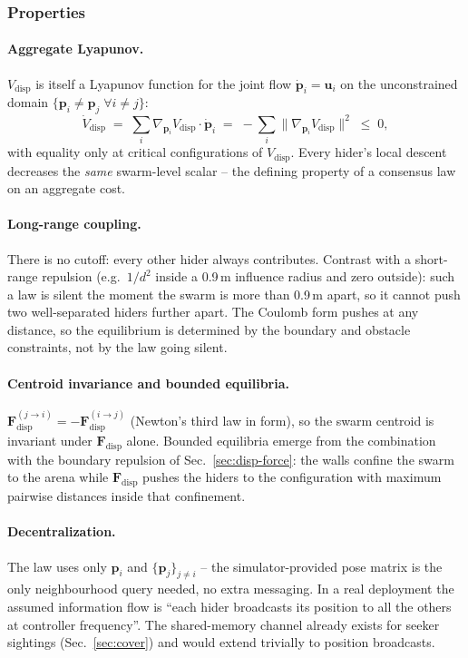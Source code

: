 \documentclass[11pt,a4paper]{article}
\newcommand{\vect}[1]{\mathbf{#1}}
\begin{document}
\subsubsection*{Properties}

\paragraph{Aggregate Lyapunov.}
$V_\mathrm{disp}$ is itself a Lyapunov function for the joint flow
$\dot{\vect{p}}_i = \vect{u}_i$ on the unconstrained domain
$\{\vect{p}_i \ne \vect{p}_j \;\forall i \ne j\}$:
\[
    \dot{V}_\mathrm{disp}
    \;=\; \sum_i \nabla_{\vect{p}_i} V_\mathrm{disp} \cdot \dot{\vect{p}}_i
    \;=\; -\sum_i \|\nabla_{\vect{p}_i} V_\mathrm{disp}\|^2
    \;\le\; 0,
\]
with equality only at critical configurations of $V_\mathrm{disp}$. Every
hider's local descent decreases the \emph{same} swarm-level scalar -- the
defining property of a consensus law on an aggregate cost.

\paragraph{Long-range coupling.}
There is no cutoff: every other hider always contributes. Contrast with a
short-range repulsion (e.g.\ $1/d^2$ inside a 0.9\,m influence radius and
zero outside): such a law is silent the moment the swarm is more than
0.9\,m apart, so it cannot push two well-separated hiders further apart.
The Coulomb form pushes at any distance, so the equilibrium is determined
by the boundary and obstacle constraints, not by the law going silent.

\paragraph{Centroid invariance and bounded equilibria.}
$\vect{F}^{(j \to i)}_\mathrm{disp} = -\vect{F}^{(i \to j)}_\mathrm{disp}$
(Newton's third law in form), so the swarm centroid is invariant under
$\vect{F}_\mathrm{disp}$ alone. Bounded equilibria emerge from the
combination with the boundary repulsion of Sec.~\ref{sec:disp-force}: the
walls confine the swarm to the arena while $\vect{F}_\mathrm{disp}$
pushes the hiders to the configuration with maximum pairwise distances
inside that confinement.

\paragraph{Decentralization.}
The law uses only $\vect{p}_i$ and $\{\vect{p}_j\}_{j \ne i}$ -- the
simulator-provided pose matrix is the only neighbourhood query needed, no
extra messaging. In a real deployment the assumed information flow is
``each hider broadcasts its position to all the others at controller
frequency''. The shared-memory channel already exists for seeker sightings
(Sec.~\ref{sec:cover}) and would extend trivially to position broadcasts.
\end{document}
